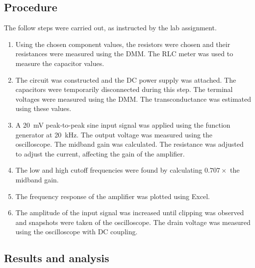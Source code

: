 \documentclass{report}
\begin{document}
\subsection{Procedure}
The follow steps were carried out, as instructed by the lab assignment.
\begin{enumerate}
	\item Using the chosen component values, the resistors were chosen and their resistances were measured using the DMM. The RLC meter was used to measure the capacitor values.
	\item The circuit was constructed and the DC power supply was attached. The capacitors were temporarily disconnected during this step. The terminal voltages were measured using the DMM. The transconductance was estimated using these values. 
	\item A \SI{20}{\mV} peak-to-peak sine input signal was applied using the function generator at \SI{20}{\kHz}. The output voltage was measured using the oscilloscope. The midband gain was calculated. The resistance was adjusted to adjust the current, affecting the gain of the amplifier.
	\item The low and high cutoff frequencies were found by calculating $0.707 \times$ the midband gain. 
	\item The frequency response of the amplifier was plotted using Excel. 
	\item The amplitude of the input signal was increased until clipping was observed and snapshots were taken of the oscilloscope. The drain voltage was measured using the oscilloscope with DC coupling.
\end{enumerate}

\subsection{Results and analysis}
\end{document}
